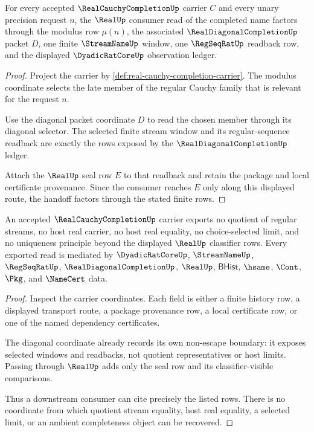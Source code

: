 \begin{theorem}
\label{thm:real-cauchy-completion-diagonal-handoff}
For every accepted $\RealCauchyCompletionUp$ carrier $C$ and every unary precision request $n$, the $\RealUp$ consumer read of the completed name factors through the modulus row $\mu(n)$, the associated $\RealDiagonalCompletionUp$ packet $D$, one finite $\StreamNameUp$ window, one $\RegSeqRatUp$ readback row, and the displayed $\DyadicRatCoreUp$ observation ledger.
\end{theorem}
\begin{proof}
Project the carrier by \autoref{def:real-cauchy-completion-carrier}. The modulus coordinate selects the late member of the regular Cauchy family that is relevant for the request $n$.

Use the diagonal packet coordinate $D$ to read the chosen member through its diagonal selector. The selected finite stream window and its regular-sequence readback are exactly the rows exposed by the $\RealDiagonalCompletionUp$ ledger.

Attach the $\RealUp$ seal row $E$ to that readback and retain the package and local certificate provenance. Since the consumer reaches $E$ only along this displayed route, the handoff factors through the stated finite rows.
\end{proof}

\begin{theorem}
\label{thm:real-cauchy-completion-non-escape-boundary}
An accepted $\RealCauchyCompletionUp$ carrier exports no quotient of regular streams, no host real carrier, no host real equality, no choice-selected limit, and no uniqueness principle beyond the displayed $\RealUp$ classifier rows. Every exported read is mediated by $\DyadicRatCoreUp$, $\StreamNameUp$, $\RegSeqRatUp$, $\RealDiagonalCompletionUp$, $\RealUp$, $\mathsf{BHist}$, $\hsame$, $\Cont$, $\Pkg$, and $\NameCert$ data.
\end{theorem}
\begin{proof}
Inspect the carrier coordinates. Each field is either a finite history row, a displayed transport route, a package provenance row, a local certificate row, or one of the named dependency certificates.

The diagonal coordinate already records its own non-escape boundary: it exposes selected windows and readbacks, not quotient representatives or host limits. Passing through $\RealUp$ adds only the seal row and its classifier-visible comparisons.

Thus a downstream consumer can cite precisely the listed rows. There is no coordinate from which quotient stream equality, host real equality, a selected limit, or an ambient completeness object can be recovered.
\end{proof}

